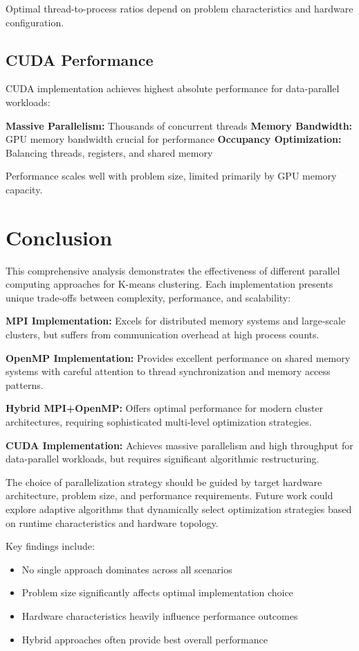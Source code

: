 \documentclass[10pt,a4paper,twocolumn]{article}
\begin{document}
Optimal thread-to-process ratios depend on problem characteristics and hardware configuration.

\subsection{CUDA Performance}

CUDA implementation achieves highest absolute performance for data-parallel workloads:

\textbf{Massive Parallelism:} Thousands of concurrent threads
\textbf{Memory Bandwidth:} GPU memory bandwidth crucial for performance
\textbf{Occupancy Optimization:} Balancing threads, registers, and shared memory

Performance scales well with problem size, limited primarily by GPU memory capacity.

\section{Conclusion}

This comprehensive analysis demonstrates the effectiveness of different parallel computing approaches for K-means clustering. Each implementation presents unique trade-offs between complexity, performance, and scalability:

\textbf{MPI Implementation:} Excels for distributed memory systems and large-scale clusters, but suffers from communication overhead at high process counts.

\textbf{OpenMP Implementation:} Provides excellent performance on shared memory systems with careful attention to thread synchronization and memory access patterns.

\textbf{Hybrid MPI+OpenMP:} Offers optimal performance for modern cluster architectures, requiring sophisticated multi-level optimization strategies.

\textbf{CUDA Implementation:} Achieves massive parallelism and high throughput for data-parallel workloads, but requires significant algorithmic restructuring.

The choice of parallelization strategy should be guided by target hardware architecture, problem size, and performance requirements. Future work could explore adaptive algorithms that dynamically select optimization strategies based on runtime characteristics and hardware topology.

Key findings include:
\begin{itemize}
\item No single approach dominates across all scenarios
\item Problem size significantly affects optimal implementation choice
\item Hardware characteristics heavily influence performance outcomes
\item Hybrid approaches often provide best overall performance
\end{itemize}
\end{document}
